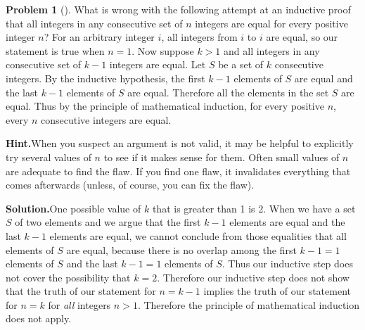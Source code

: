 \documentclass[10pt,]{book}
\theoremstyle{plain}
\theoremstyle{definition}
\newtheorem{activity}[project]{Problem}
\theoremstyle{definition}
\numberwithin{equation}{chapter}
\begin{document}
\begin{activity}[]\label{activity-366}
What is wrong with the following attempt at an inductive proof that all integers in any consecutive set of \(n\) integers are equal for every positive integer \(n\)? For an arbitrary integer \(i\), all integers from \(i\) to \(i\) are equal, so our statement is true when \(n=1\). Now suppose \(k>1\) and all integers in any consecutive set of \(k-1\) integers are equal. Let \(S\) be a set of \(k\) consecutive integers. By the inductive hypothesis, the first \(k-1\) elements of \(S\) are equal and the last \(k-1\) elements of \(S\) are equal. Therefore all the elements in the set \(S\) are equal. Thus by the principle of mathematical induction, for every positive \(n\), every \(n\) consecutive integers are equal.%
\par\medskip\noindent%
\textbf{Hint.}\quad When you suspect an argument is not valid, it may be helpful to explicitly try several values of \(n\) to see if it makes sense for them. Often small values of \(n\) are adequate to find the flaw. If you find one flaw, it invalidates everything that comes afterwards (unless, of course, you can fix the flaw).%
\par\medskip\noindent%
\textbf{Solution.}\quad One possible value of \(k\) that is greater than 1 is 2. When we have a set \(S\) of two elements and we argue that the first \(k-1\) elements are equal and the last \(k-1\) elements are equal, we cannot conclude from those equalities that all elements of \(S\) are equal, because there is no overlap among the first \(k-1=1\) elements of \(S\) and the last \(k-1=1\) elements of \(S\). Thus our inductive step does not cover the possibility that \(k=2\). Therefore our inductive step does not show that the truth of our statement for \(n=k-1\) implies the truth of our statement for \(n=k\) for \emph{all} integers \(n>1\). Therefore the principle of mathematical induction does not apply.%
\end{activity}
\typeout{************************************************}
\typeout{************************************************}
\end{document}

